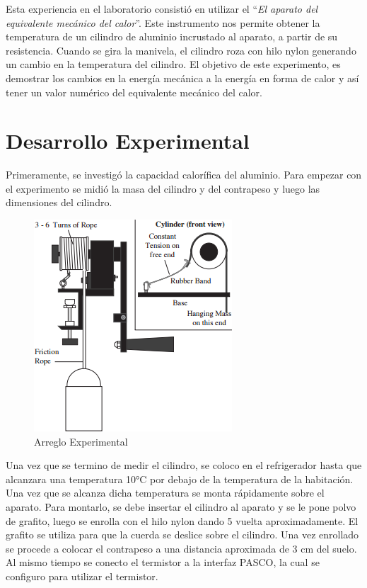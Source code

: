 \documentclass[12pt]{article}
\begin{document}
\hspace{0.5cm} Esta experiencia en el laboratorio consistió en utilizar el ``\textit{El aparato del equivalente mecánico del calor}''. Este instrumento nos permite obtener la temperatura de un cilindro de aluminio incrustado al aparato, a partir de su resistencia. Cuando se gira la manivela, el cilindro roza con hilo nylon generando un cambio en la temperatura del cilindro. El objetivo de este experimento, es demostrar los cambios en la energía mecánica a la energía en forma de calor y así tener un valor numérico del equivalente mecánico del calor.
\pagebreak

\section{Desarrollo Experimental}\vspace{-0.5cm}
Primeramente, se investigó la capacidad calorífica del aluminio. Para empezar con el experimento se midió la masa del cilindro y del contrapeso y luego las dimensiones del cilindro.

\begin{figure}[H]
\centering
\includegraphics[width=0.35\linewidth ]{arregloS.png}
\caption{Arreglo Experimental}
\label{fig:Arreglo}
\end{figure}

Una vez que se termino de medir el cilindro, se coloco en el refrigerador hasta que alcanzara una temperatura 10°C por debajo de la temperatura de la habitación. Una vez que se alcanza dicha temperatura se monta rápidamente sobre el aparato. Para montarlo, se debe insertar el cilindro al aparato y se le pone polvo de grafito, luego se enrolla con el hilo nylon dando 5 vuelta aproximadamente. El grafito se utiliza para que la cuerda se deslice sobre el cilindro. Una vez enrollado se procede a colocar el contrapeso a una distancia aproximada de 3 cm del suelo. Al mismo tiempo se conecto el termistor a la interfaz PASCO, la cual se configuro para utilizar el termistor.
\end{document}
